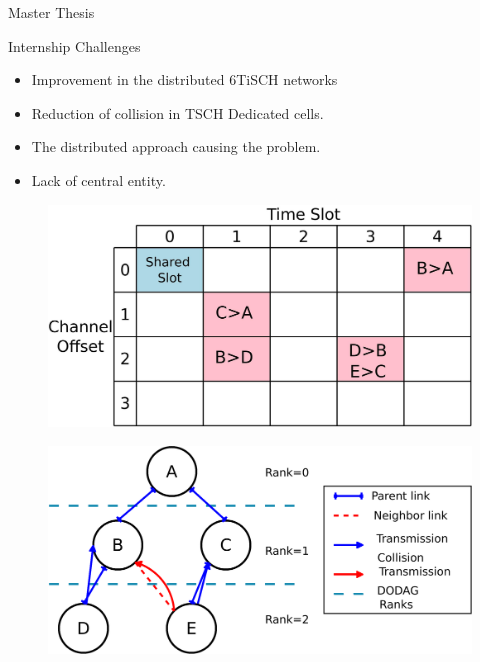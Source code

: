 \documentclass{beamer}
\begin{document}
\begin{frame}{Master Thesis}

\begin{minipage}[t]{0.48\linewidth}

\begin{block}{Internship Challenges}
    \begin{itemize}
    
    \item Improvement in the distributed 6TiSCH networks
    \item<2-> Reduction of collision in TSCH Dedicated cells.
     \item<3-> The distributed approach causing the problem. 
      \item<4-> Lack of central entity. 
      
     
    
    \end{itemize}
    \end{block}
\end{minipage}\hfill
\begin{minipage}[t]{0.48\linewidth}
\centering
\begin{figure}[p]

\includegraphics[width=\linewidth]{TSCH.jpeg}

\end{figure}
\begin{figure}[p]


\item<2-> \includegraphics[width=\linewidth]{Diagram1.png}
\end{figure}
\end{minipage}
\end{frame}
\end{document}
